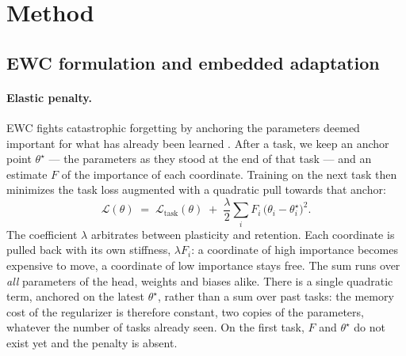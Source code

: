 \section{Method}
\label{sec:method}

\subsection{EWC formulation and embedded adaptation}
\label{sec:ewc_formulation}

\paragraph{Elastic penalty.} EWC fights catastrophic forgetting by anchoring the parameters deemed
important for what has already been learned \cite{Kirkpatrick2017EWC}. After a task, we keep an
anchor point $\theta^\star$ --- the parameters as they stood at the end of that task --- and an
estimate $F$ of the importance of each coordinate. Training on the next task then minimizes the task
loss augmented with a quadratic pull towards that anchor:
\begin{equation}
\label{eq:ewc_loss}
\mathcal{L}(\theta) \;=\; \mathcal{L}_{\text{task}}(\theta)
\;+\; \frac{\lambda}{2} \sum_{i} F_i \,\bigl(\theta_i - \theta^\star_i\bigr)^2 .
\end{equation}
The coefficient $\lambda$ arbitrates between plasticity and retention. Each coordinate is pulled back
with its own stiffness, $\lambda F_i$: a coordinate of high importance becomes expensive to move, a
coordinate of low importance stays free. The sum runs over \emph{all} parameters of the head, weights
and biases alike. There is a single quadratic term, anchored on the latest $\theta^\star$, rather
than a sum over past tasks: the memory cost of the regularizer is therefore constant, two copies of
the parameters, whatever the number of tasks already seen. On the first task, $F$ and $\theta^\star$
do not exist yet and the penalty is absent.

